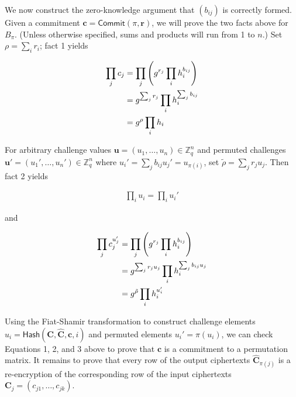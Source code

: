 \documentclass[12pt,a4paper]{article}
\newcommand{\commit}{\mathsf{Commit}}
\theoremstyle{definition}
\begin{document}
We now construct the zero-knowledge argument that $(b_{ij})$ is correctly formed. Given a commitment $\mathbf{c}=\commit(\pi,\mathbf{r})$, we will prove the two facts above for $B_\pi$. (Unless otherwise specified, sums and products will run from 1 to $n$.) Set $\rho = \sum_i r_i$; fact 1 yields

\begin{align}
\prod_j c_j &= \prod_j \left(g^{r_j}\prod_i h_i^{b_{ij}}\right)\notag\\
            &= g^{\sum_j r_j}\prod_i h_i^{\sum_j b_{ij}}\notag\\
            &= g^\rho\prod_i h_i \label{wikstrom-1}
\end{align}

For arbitrary challenge values $\mathbf{u}=(u_1, \ldots, u_n)\in\mathbb{Z}_q^n$ and permuted challenges $\mathbf{u'}=(u_1',\ldots,u_n')\in\mathbb{Z}_q^n$ where $u_i' = \sum_j b_{ij} u_j' = u_{\pi(i)}$, set $\tilde{\rho}=\sum_j r_j u_j$. Then fact 2 yields

\begin{align}
    \prod_i u_i = \prod_i u_i' \label{wikstrom-2}
\end{align}

and

\begin{align}
    \prod_j c_j^{u_j'}   &= \prod_j\left(g^{r_j}\prod_i h_i^{b_{ij}}\right)\notag\\    
                        &= g^{\sum_j r_j u_j}\prod_i h_i^{\sum_j b_{ij} u_j}\notag\\
                        &= g^{\tilde{\rho}} \prod_i h_i^{u_i'} \label{wikstrom-3}
\end{align}

Using the Fiat-Shamir transformation to construct challenge elements \\ $u_i=\mathsf{Hash}(\mathbf{C}, \mathbf{\hat{C}}, \mathbf{c}, i)$ and permuted elements $u_i'=\pi(u_i)$, we can check Equations 1, 2, and 3 above to prove that $\mathbf{c}$ is a commitment to a permutation matrix. It remains to prove that every row of the output ciphertexts $\mathbf{\hat{C}}_{\pi(j)}$ is a re-encryption of the corresponding row of the input ciphertexts $\mathbf{C}_j=(c_{j1},\ldots,c_{jk})$.
\end{document}
